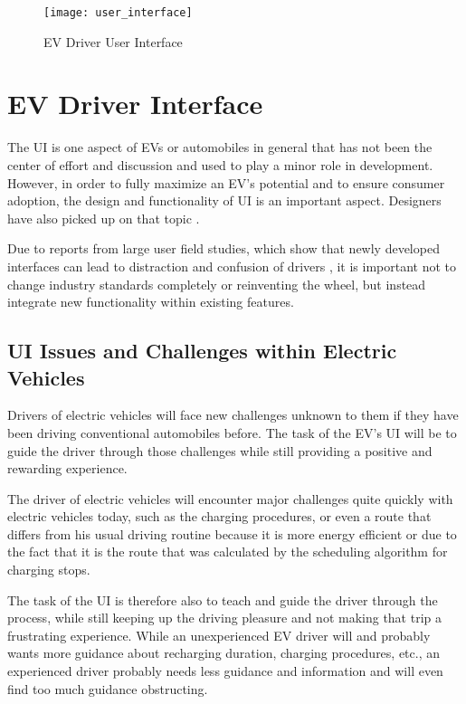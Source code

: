 \clearpage

\begin{figure*}[ht]
\centering
\texttt{[image: user\_interface]}
\caption{EV Driver User Interface}
\end{figure*}

\section{EV Driver Interface}

The UI is one aspect of EVs or automobiles in general that has not been the center of effort and discussion and used to play a minor role in development. However, in order to fully maximize an EV's potential and to ensure consumer adoption, the design and functionality of UI is an important aspect. Designers have also picked up on that topic \cite{driver-1}.

Due to reports from large user field studies, which show that newly developed interfaces can lead to distraction and confusion of drivers \cite{driver-2} \cite{driver-3}, it is important not to change industry standards completely or reinventing the wheel, but instead integrate new functionality within existing features. 

\subsection{UI Issues and Challenges within Electric Vehicles}

Drivers of electric vehicles will face new challenges unknown to them if they have been driving conventional automobiles before. The task of the EV's UI will be to guide the driver through those challenges while still providing a positive and rewarding experience.

The driver of electric vehicles will encounter major challenges quite quickly with electric vehicles today, such as the charging procedures, or even a route that differs from his usual driving routine because it is more energy efficient or due to the fact that it is the route that was calculated by the scheduling algorithm for charging stops.

The task of the UI is therefore also to teach and guide the driver through the process, while still keeping up the driving pleasure and not making that trip a frustrating experience. While an unexperienced EV driver will and probably wants more guidance about recharging duration, charging procedures, etc., an experienced driver probably needs less guidance and information and will even find too much guidance obstructing.

